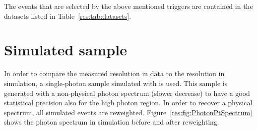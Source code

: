 The events that are selected by the above mentioned triggers are contained in the datasets listed in Table~\ref{res:tab:datasets}.
\renewcommand{\arraystretch}{1.5}
\begin{table}[!hbt]
\centering
\caption{Single-photon data samples used for the resolution measurement with the contained integrated luminosity.}
\label{res:tab:datasets}
\end{table}  

\section{Simulated sample}
\label{res:sec:SimulatedSamples}

In order to compare the measured resolution in data to the resolution in simulation, a single-photon sample simulated with \pythiaSix is used.
This sample is generated with a non-physical photon \pt spectrum (slower decrease) to have a good statistical precision also for the high photon \pt region.
In order to recover a physical \pt spectrum, all simulated events are reweighted.
Figure~\ref{res:fig:PhotonPtSpectrum} shows the photon \pt spectrum in simulation before and after reweighting. 


